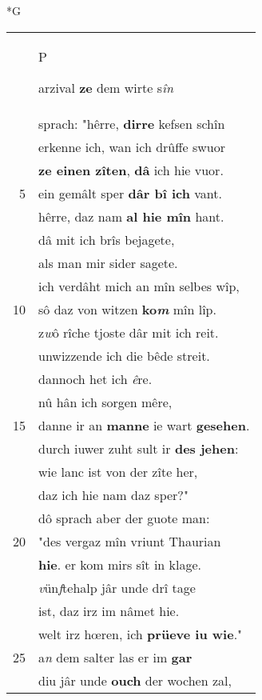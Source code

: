 \documentclass[8pt,a4paper,notitlepage]{article}
\begin{document}
\begin{table}[ht]
\begin{minipage}[t]{0.5\linewidth}
\small
\begin{center}*G
\end{center}
\begin{tabular}{rl}
 & \begin{large}P\end{large}arzival \textbf{ze} dem wirte s\textit{în}\\ 
 & sprach: "hêrre, \textbf{dirre} kefsen schîn\\ 
 & erkenne ich, wan ich drûffe swuor\\ 
 & \textbf{ze einen zîten}, \textbf{dâ} ich hie  vuor.\\ 
5 & ein gemâlt sper \textbf{dâr bî ich} vant.\\ 
 & hêrre, daz nam \textbf{al hie mîn} hant.\\ 
 & dâ mit ich brîs bejagete,\\ 
 & als man mir sider sagete.\\ 
 & ich verdâht mich an mîn selbes wîp,\\ 
10 & sô daz von witzen \textbf{ko\textit{m}} mîn lîp.\\ 
 & z\textit{w}ô rîche tjoste dâr mit ich reit.\\ 
 & unwizzende ich die bêde streit.\\ 
 & dannoch het ich \textit{ê}re.\\ 
 & nû hân ich sorgen mêre,\\ 
15 & danne ir an \textbf{manne} ie wart \textbf{gesehen}.\\ 
 & durch iuwer zuht sult ir \textbf{des jehen}:\\ 
 & wie lanc ist von der zîte her,\\ 
 & daz ich hie nam daz sper?"\\ 
 & dô sprach aber der guote man:\\ 
20 & "des vergaz mîn vriunt Thaurian\\ 
 & \textbf{hie}. er kom mirs sît in klage.\\ 
 & \textit{v}ün\textit{f}tehalp jâr unde drî tage\\ 
 & ist, daz irz im nâmet hie.\\ 
 & welt irz hœren, ich \textbf{prüeve iu wie}."\\ 
25 & a\textit{n} dem salter las er im \textbf{gar}\\ 
 & diu jâr unde \textbf{ouch} der wochen zal,\\ 

\end{tabular}
\end{minipage}
\end{table}
\end{document}
